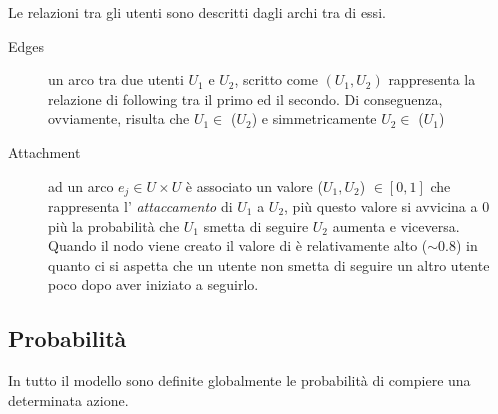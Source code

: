 Le relazioni tra gli utenti sono descritti dagli archi tra di essi.
\begin{description}
  \item[Edges] un arco tra due utenti $U_1$ e $U_2$, scritto come
  $(U_1 ,U_2)$ rappresenta la relazione di following tra il primo 
  ed il secondo. Di conseguenza, ovviamente, 
  risulta che $U_1 \in $  \followers{}($U_2$) e simmetricamente
   $U_2 \in $  \following{}($U_1$)
   \item[Attachment] ad un arco $e_j \in U\times U$ \`e associato un 
   valore \attach{}($U_1, U_2$) $ \in [0,1]$ che rappresenta l' 
   \textit{attaccamento} di $U_1$ a $U_2$, pi\`u questo valore si 
   avvicina a 0 pi\`u la probabilit\`a che $U_1$ smetta di seguire
   $U_2$ aumenta e viceversa. Quando il nodo viene creato il valore
   di \attach{} \`e relativamente alto ($\sim 0.8$) in quanto ci si 
   aspetta che un utente non smetta di seguire un altro utente
   poco dopo aver iniziato a seguirlo.
\end{description}

\subsection{Probabilit\`a}
\label{subsec:prob}

In tutto il modello sono definite globalmente le 
probabilit\`a di compiere una determinata azione.

